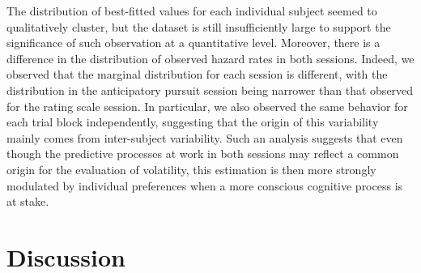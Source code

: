 \documentclass[10pt,letterpaper]{article}
\newcommand{\ms}{\si{\milli\second}}%
\begin{document}
The distribution of best-fitted values for each individual subject seemed to qualitatively cluster,
but the dataset is still insufficiently large to support the significance of such observation
at a quantitative level.
Moreover, there is a difference in the distribution of observed hazard rates in both sessions.
Indeed, we observed that the marginal distribution for each session is different,
with the distribution in the anticipatory pursuit session being narrower than
that observed for the rating scale session.
In particular, we also observed the same behavior for each trial block independently,
suggesting that the origin of this variability mainly comes from inter-subject variability.
Such an analysis suggests that even though the predictive processes
at work in both sessions may reflect a common origin for the evaluation of volatility,
this estimation is then more strongly modulated by individual preferences
when a more conscious cognitive process is at stake.
\section{Discussion}
\label{sec:outro}
\end{document}
